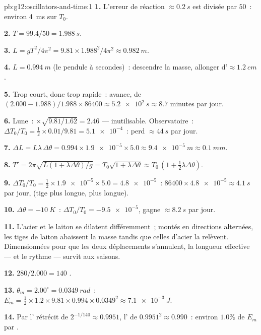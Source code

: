 \begin{solution}{pb:g12:oscillators-and-time:1}
\textbf{1.} L'erreur de réaction $\approx \qty{0.2}{s}$ est divisée
par $50$~: environ \qty{4}{ms} sur $T_0$.

\textbf{2.} $T = 99.4/50 = \qty{1.988}{s}$.

\textbf{3.} $L = gT^2/4\pi^2 = 9.81 \times 1.988^2/4\pi^2 \approx
\qty{0.982}{m}$.

\textbf{4.} $L = \qty{0.994}{m}$ (le pendule à secondes)~: descendre
la masse, allonger d'$\approx \qty{1.2}{cm}$.

\textbf{5.} Trop court, donc trop rapide~: avance, de $(2.000 -
1.988)/1.988 \times 86400 \approx \qty{5.2e2}{s} \approx 8.7$
minutes par jour.

\textbf{6.} Lune~: $\times\sqrt{9.81/1.62} = 2.46$ --- inutilisable.
Observatoire~: $\Delta T_0/T_0 = \tfrac12 \times 0.01/9.81 =
\num{5.1e-4}$~: perd $\approx \qty{44}{s}$ par jour.

\textbf{7.} $\Delta L = L\lambda\,\Delta\theta = 0.994 \times
\num{1.9e-5} \times 5.0 \approx \qty{9.4e-5}{m} \approx
\qty{0.1}{mm}$.

\textbf{8.} $T' = 2\pi\sqrt{L(1 + \lambda\Delta\theta)/g} =
T_0\sqrt{1 + \lambda\Delta\theta} \approx T_0\,(1 + \tfrac12
\lambda\Delta\theta)$.

\textbf{9.} $\Delta T_0/T_0 = \tfrac12 \times \num{1.9e-5} \times
5.0 = \num{4.8e-5}$~: $86400 \times \num{4.8e-5} \approx
\qty{4.1}{s}$ par jour,  (tige plus longue, 
plus longue).

\textbf{10.} $\Delta\theta = \qty{-10}{K}$~: $\Delta T_0/T_0 =
\num{-9.5e-5}$, gagne $\approx \qty{8.2}{s}$ par jour.

\textbf{11.} L'acier et le laiton se dilatent différemment~; montés
en directions alternées, les tiges de laiton abaissent la masse
tandis que celles d'acier la relèvent. Dimensionnées pour que les
deux déplacements s'annulent, la longueur effective --- et le rythme
--- survit aux saisons.

\textbf{12.} $280/2.000 = 140$ .

\textbf{13.} $\theta_m = 2.00^\circ = \qty{0.0349}{rad}$~: $E_m =
\tfrac12 \times 1.2 \times 9.81 \times 0.994 \times 0.0349^2 \approx
\qty{7.1e-3}{J}$.

\textbf{14.} Par  l'
rétrécit de $2^{-1/140} \approx 0.9951$, l' de
$0.9951^2 \approx 0.990$~: environ $1.0\%$ de $E_m$ par
.


\end{solution}
